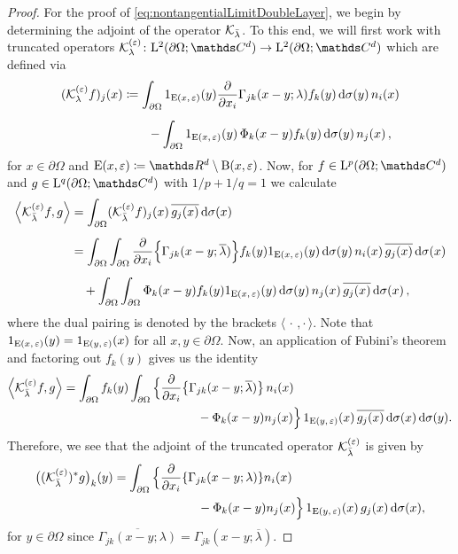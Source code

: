\begin{proof}
  For the proof of \eqref{eq:nontangentialLimitDoubleLayer}, we begin by determining the adjoint of the operator $\mathcal{K}_{\bar\lambda}$.
  To this end, we will first work with truncated operators $\K_{\lambda}^{(\varepsilon)} \colon \Ell^2(\partial\Omega; \C^d) \to \Ell^2(\partial\Omega; \C^d)$ which are defined via
  \begin{align*}
    (\mathcal{K}_\lambda^{(\varepsilon)} f)_j (x)
    &\coloneqq \int_{\partial\Omega} 1_{\mathrm{E}(x, \,\varepsilon)}(y) \frac{\partial}{\partial x_i} \Gamma_{jk}(x - y; \lambda)  f_k(y) \, {\operatorname{d}\!{\sigma}}(y) \, n_i(x) \\[0.5em]
    &\qquad - \int_{\partial\Omega} 1_{\mathrm{E}(x, \,\varepsilon)}(y)\, \Phi_k(x - y) f_k(y) \, {\operatorname{d}\!{\sigma}}(y) \, n_j(x)\,,
  \end{align*}
  for $x \in \partial\Omega$ and $\EE(x,\varepsilon) \coloneqq \R^d \setminus \BB(x, \varepsilon)$.
  Now, for $f \in \Ell^p(\partial\Omega; \C^d)$ and $g \in \Ell^q(\partial\Omega; \C^d)$ with $1/p + 1/q = 1$ we calculate
  \begin{align*}
    \Big\langle \mathcal{K}_{\bar\lambda}^{(\varepsilon)}f, g \Big\rangle
    &= \int_{\partial\Omega} (\mathcal{K}_{\bar\lambda}^{(\varepsilon)} f)_j(x) \, \overline{g_j(x)} \, {\operatorname{d}\!{\sigma}}(x) \\[0.5em]
    &= \int_{\partial\Omega} \int_{\partial\Omega} \frac{\partial}{\partial x_i} \Big\{ \Gamma_{jk} (x - y; \overline\lambda) \Big\} f_k(y) 1_{\mathrm{E}(x, \,\varepsilon)}(y) \, {\operatorname{d}\!{\sigma}}(y) \, n_i(x) \, \overline{g_j(x)} \, {\operatorname{d}\!{\sigma}}(x) \\[0.5em]
    &\quad+ \int_{\partial\Omega} \int_{\partial\Omega} \Phi_k(x -y)f_k(y) 1_{\mathrm{E}(x,\, \varepsilon)}(y) \, {\operatorname{d}\!{\sigma}}(y) \, n_j(x) \, \overline{g_j(x)} \, {\operatorname{d}\!{\sigma}}(x)\,,
  \end{align*}
  where the dual pairing is denoted by the brackets $\langle \,\cdot\,, \cdot\, \rangle$.
  Note that $1_{\mathrm{E}(x,\, \varepsilon)}(y) = 1_{\mathrm{E}(y,\, \varepsilon)}(x)$ for all $x, y \in \partial\Omega$.
  Now, an application of Fubini's theorem and factoring out $f_k(y)$ gives us the identity
  \newpage
  \begin{align*}
    \Big\langle \mathcal{K}_{\bar\lambda}^{(\varepsilon)}f, g \Big\rangle 
    =
    \int_{\partial\Omega} f_k(y) \int_{\partial\Omega} \Big\{ & \frac{\partial}{\partial x_i} \big\{  \Gamma_{jk}(x - y; \overline\lambda)\big\}\, n_i(x) \\
    &\qquad \quad - \Phi_k(x - y)  n_j(x) \Big\}\, 1_{\mathrm{E}(y,\, \varepsilon)}(x)\, \overline{g_j(x)} \, {\operatorname{d}\!{\sigma}}(x) \, {\operatorname{d}\!{\sigma}}(y).
  \end{align*}
  Therefore, we see that the adjoint of the truncated operator $\mathcal{K}_{\bar\lambda}^{(\varepsilon)}$ is given by
  \begin{align*}
    \big( ( \mathcal{K}_{\bar\lambda}^{(\varepsilon)})^* g\big)_k(y)
    = \int_{\partial\Omega} \Big\{ &\frac{\partial}{\partial x_i} \{ \Gamma_{jk}(x - y; \lambda)\} n_i(x) \\
    &\qquad\quad - \Phi_k(x - y) n_j(x)\Big\}\, 1_{\mathrm{E}(y,\,\varepsilon)}(x) \, g_j(x) \, {\operatorname{d}\!{\sigma}}(x), 
  \end{align*}
  for $y \in \partial\Omega$ since $\overline{\Gamma_{jk}(x - y; \lambda)} = \Gamma_{jk}(x - y; \overline\lambda)$.


\end{proof}
